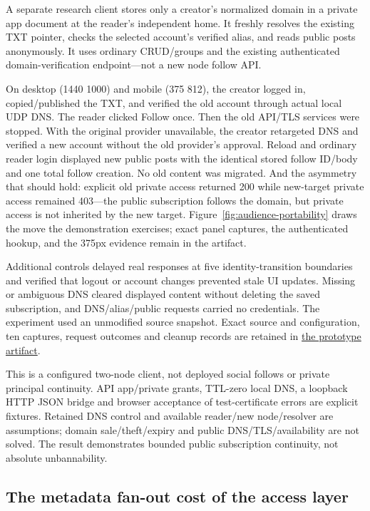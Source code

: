 \documentclass[sigconf, nonacm]{acmart}
\newcommand{\artifactbase}{https://github.com/jacoby149/web10}
\newcommand{\domainartifactrev}{26720acba859c7eb03fc5d26a6221cdde5b764a1}
\newcommand{\domainartifactdir}[2]{\href{\artifactbase/tree/\domainartifactrev/#1}{#2}}
\begin{document}
A separate research client stores only a creator's normalized domain in a
private app document at the reader's independent home. It freshly resolves
the existing TXT pointer, checks the selected account's verified alias, and
reads public posts anonymously. It uses ordinary CRUD/groups and the existing
authenticated domain-verification endpoint---not a new node follow API.

On desktop (1440\,\texttimes\,1000) and mobile (375\,\texttimes\,812), the
creator logged in, copied/published the TXT, and verified the old account
through actual local UDP DNS. The reader clicked Follow once. Then the old
API/TLS services were stopped. With the original provider unavailable, the
creator retargeted DNS and verified a new account without the old provider's
approval. Reload and ordinary reader login displayed new public posts with
the identical stored follow ID/body and one total follow creation. No old
content was migrated. And the asymmetry that should hold: explicit old
private access returned 200 while new-target private access remained
403---the public subscription follows the domain, but private access is not
inherited by the new target. Figure~\ref{fig:audience-portability} draws the
move the demonstration exercises; exact panel captures, the authenticated
hookup, and the 375px evidence remain in the artifact.

Additional controls delayed real responses at five identity-transition
boundaries and verified that logout or account changes prevented stale UI
updates. Missing or ambiguous DNS cleared displayed content without deleting
the saved subscription, and DNS/alias/public requests carried no credentials.
The experiment used an unmodified source snapshot. Exact source and
configuration, ten captures, request outcomes and cleanup records are
retained in \domainartifactdir{research/domain-portability-demo}{the
prototype artifact}.

This is a configured two-node client, not deployed social follows or private
principal continuity. API app/private grants, TTL-zero local DNS, a loopback
HTTP JSON bridge and browser acceptance of test-certificate errors are
explicit fixtures. Retained DNS control and available reader/new node/resolver
are assumptions; domain sale/theft/expiry and public DNS/TLS/availability are
not solved. The result demonstrates bounded public subscription continuity,
not absolute unbannability.

\subsection{The metadata fan-out cost of the access layer}
\label{sec:fanout}
\end{document}
